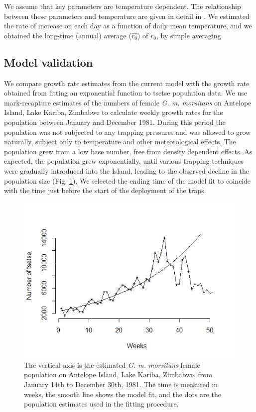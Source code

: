 \documentclass[12pt,a4paper]{article}
\begin{document}
We assume that key parameters are temperature dependent. The relationship between these parameters and temperature are given in detail in \cite{Are2019}. We estimated the rate of increase on each day as a function of daily mean temperature, and we obtained the long-time (annual) average ($\hat{r_0}$)  of $r_0$, by simple averaging.

\subsection*{Model validation}
We compare growth rate estimates from the current model with the growth rate obtained from fitting an exponential function to tsetse population data. We use mark-recapture estimates of the numbers of female \textit{G. m. morsitans} on Antelope Island, Lake Kariba, Zimbabwe \cite{hargrove1998optimized} to calculate weekly growth rates for the population between January and December 1981. During this period the population was not subjected to any trapping pressures and was allowed to grow naturally, subject only to temperature and other meteorological effects. The population grew from a low base number, free from density dependent effects.  As expected, the population grew exponentially, until various trapping techniques were gradually introduced into the Island, leading to the observed decline in the population size (Fig. \ref{fig:antelopeEst}). We selected the ending time of the model fit to coincide with the time just before the start of the deployment of the traps. 
\begin{figure}[hbt!]
	\centering
	\includegraphics[width=0.9\linewidth]{Feb_06_fitGrouwthRate}
	\caption{The vertical axis is the estimated \textit{G. m. morsitans} female population on Antelope Island, Lake Kariba, Zimbabwe, from January 14th to December 30th, 1981. The time is measured in weeks, the smooth line shows the model fit, and the dots are the population estimates used in the fitting procedure.}
	\label{fig:antelopeEst}
\end{figure}
\end{document}
